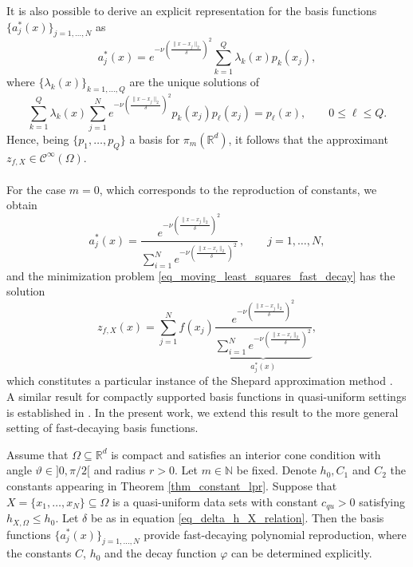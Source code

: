 \documentclass{drna}
\begin{document}
\noindent It is also possible to derive an explicit representation for the basis functions $\{a_{j}^{*}(x)\}_{j=1,\dots,N}$ as
\begin{equation*}
    a_{j}^{*}(x) = e^{-\nu \left(\frac{\|x-x_j\|_2}{\delta}\right)^2}\sum_{k=1}^{Q}\lambda_k(x)p_k(x_j),
\end{equation*}
where $\{\lambda_k(x)\}_{k=1,\dots,Q}$ are the unique solutions of
\begin{equation}
    \sum_{k=1}^{Q} \lambda_k(x) \sum_{j=1}^{N} e^{-\nu \left(\frac{\|x-x_j\|_2}{\delta}\right)^2}p_k(x_j)p_{\ell}(x_j)=p_{\ell}(x), \qquad 0 \leq \ell \leq Q.
    \label{eq_del_lambda_k_x_exp_fast_decay}
\end{equation}
 Hence, being $\{p_1, \dots, p_Q\}$ a basis for $\pi_{m}(\mathbb{R}^d)$, it follows that the approximant $z_{f,X} \in \mathcal{C}^{\infty}(\Omega)$. 
 \\ \\
For the case $m=0$, which corresponds to the reproduction of constants, we obtain
\begin{equation*}
    a_{j}^{*}(x) = \frac{e^{-\nu \left(\frac{\|x-x_j\|_2}{\delta}\right)^2}}{\sum_{i=1}^{N} e^{-\nu \left(\frac{\|x-x_i\|_2}{\delta}\right)^2}}\,, \qquad  j =1, \dots, N,
\end{equation*}
and the minimization problem \eqref{eq_moving_least_squares_fast_decay} has the solution 
\begin{equation}
    z_{f,X}(x) = \sum_{j=1}^{N} f(x_j) \underbrace{\frac{e^{-\nu \left(\frac{\|x-x_j\|_2}{\delta}\right)^2}}{\sum_{i=1}^N e^{-\nu \left(\frac{\|x-x_i\|_2}{\delta}\right)^2}}}_{a_{j}^{*}(x)},
    \label{eq_shepard_method_general}
\end{equation}
which constitutes a particular instance of the Shepard approximation method \cite{shepard_1968}.
\\
A similar result for compactly supported basis functions in quasi-uniform settings is established in \cite[Theorem 4.7]{wendland_2004}. In the present work, we extend this result to the more general setting of fast-decaying basis functions.
\begin{theorem}
    Assume that $\Omega \subseteq \mathbb{R}^d$ is compact and satisfies an interior cone condition with angle $\vartheta \in ]0,\pi/2[$ and radius $r>0$. Let $m \in \mathbb{N}$ be fixed. Denote $h_0, C_1$ and $C_2$ the constants appearing in Theorem \ref{thm_constant_lpr}. Suppose that $X=\{x_1, \dots, x_N\} \subseteq \Omega$ is a quasi-uniform data sets with constant $c_{qu}>0$ satisfying $h_{X,\Omega} \leq h_0$. Let $\delta$ be as in equation \eqref{eq_delta_h_X_relation}. Then the basis functions $\{a_{j}^{*}(x)\}_{j=1,\dots,N}$ provide fast-decaying polynomial reproduction, where the constants $C$, $h_0$ and the decay function $\varphi$ can be determined explicitly.
    \label{thm_pr_fast_decay_exp}
\end{theorem}
\end{document}
